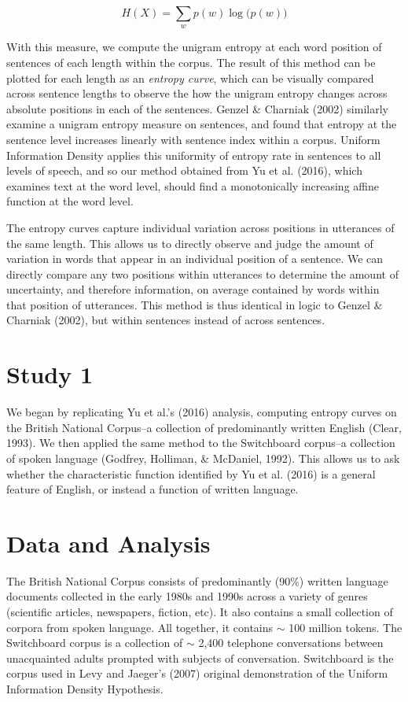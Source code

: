 \documentclass[10pt, letterpaper]{article}
\begin{document}
\[H(X) = \sum\limits_w p(w)\log\big(p(w)\big)\]

With this measure, we compute the unigram entropy at each word position
of sentences of each length within the corpus. The result of this method
can be plotted for each length as an \emph{entropy curve}, which can be
visually compared across sentence lengths to observe the how the unigram
entropy changes across absolute positions in each of the sentences.
Genzel \& Charniak (2002) similarly examine a unigram entropy measure on
sentences, and found that entropy at the sentence level increases
linearly with sentence index within a corpus. Uniform Information
Density applies this uniformity of entropy rate in sentences to all
levels of speech, and so our method obtained from Yu et al. (2016),
which examines text at the word level, should find a monotonically
increasing affine function at the word level.

The entropy curves capture individual variation across positions in
utterances of the same length. This allows us to directly observe and
judge the amount of variation in words that appear in an individual
position of a sentence. We can directly compare any two positions within
utterances to determine the amount of uncertainty, and therefore
information, on average contained by words within that position of
utterances. This method is thus identical in logic to Genzel \& Charniak
(2002), but within sentences instead of across sentences.

\hypertarget{study-1}{%
\section{Study 1}\label{study-1}}

We began by replicating Yu et al.'s (2016) analysis, computing entropy
curves on the British National Corpus--a collection of predominantly
written English (Clear, 1993). We then applied the same method to the
Switchboard corpus--a collection of spoken language (Godfrey, Holliman,
\& McDaniel, 1992). This allows us to ask whether the characteristic
function identified by Yu et al. (2016) is a general feature of English,
or instead a function of written language.

\hypertarget{data-and-analysis}{%
\section{Data and Analysis}\label{data-and-analysis}}

The British National Corpus consists of predominantly (90\%) written
language documents collected in the early 1980s and 1990s across a
variety of genres (scientific articles, newspapers, fiction, etc). It
also contains a small collection of corpora from spoken language. All
together, it contains \(\sim\) 100 million tokens. The Switchboard
corpus is a collection of \(\sim\) 2,400 telephone conversations between
unacquainted adults prompted with subjects of conversation. Switchboard
is the corpus used in Levy and Jaeger's (2007) original demonstration of
the Uniform Information Density Hypothesis.
\end{document}
